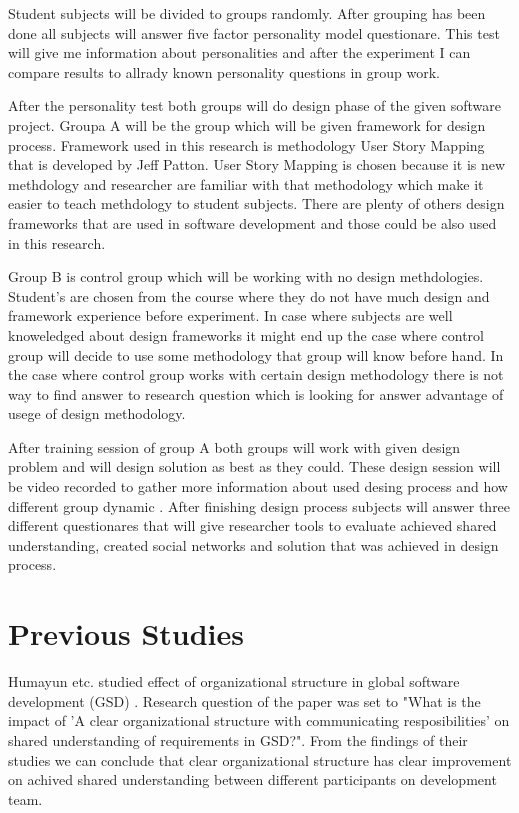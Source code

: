 \documentclass[english]{tktltiki2}
\theoremstyle{definition}
\theoremstyle{remark}
\begin{document}
Student subjects will be divided to groups randomly. After grouping has been done all subjects will answer five factor personality model questionare\cite{fiveFactor}. This test will give me information about personalities and after the experiment I can compare results to allrady known personality questions in group work.

After the personality test both groups will do design phase of the given software project. Groupa A will be the group which will be given framework for design process. Framework used in this research is methodology User Story Mapping that is developed by Jeff Patton\cite{userStoryMapping}. User Story Mapping is chosen because it is new methdology and researcher are familiar with that methodology which make it easier to teach methdology to student subjects. There are plenty of others design frameworks that are used in software development and those could be also used in this research.

Group B is control group which will be working with no design methdologies. Student's are chosen from the course where they do not have much design and framework experience before experiment. In case where subjects are well knoweledged about design frameworks it might end up the case where control group will decide to use some methodology that group will know before hand. In the case where control group works with certain design methodology there is not way to find answer to research question which is looking for answer advantage of usege of design methodology.

After training session of group A both groups will work with given design problem and will design solution as best as they could. These design session will be video recorded to gather more information about used desing process and how different group dynamic . After finishing design process subjects will answer three different questionares that will give researcher tools to evaluate achieved shared understanding, created social networks and solution that was achieved in design process.


\section{Previous Studies}

Humayun etc. studied effect of organizational structure in global software development (GSD) \cite{organizationalStructure}. Research question of the paper was set to "What is the impact of 'A clear organizational structure with communicating resposibilities' on shared understanding of requirements in GSD?". From the findings of their studies we can conclude that clear organizational structure has clear improvement on achived shared understanding between different participants on development team.
\end{document}
